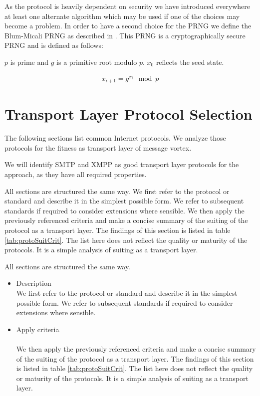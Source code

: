 As the protocol is heavily dependent on security we have introduced everywhere at least one alternate algorithm which may be used if one of the choices may become a problem. In order to have a second choice for the PRNG we define the Blum-Micali PRNG as described in \cite{blum1984generate}. This PRNG is a cryptographically secure PRNG and is defined as follows:

$p$ is prime and $g$ is a primitive root modulo $p$. $x_0$ reflects the seed state.

\begin{eqnarray}
x_{i+1}=g^{x_i}\mod p
\end{eqnarray}


\section{Transport Layer Protocol Selection\label{sec:transportProtocols}}
The following sections list common Internet protocols. We analyze those protocols for the fitness as transport layer of message vortex. 

We will identify SMTP and XMPP as good transport layer protocols for the \MessageVortex approach, as they have all required properties.

All sections are structured the same way. We first refer to the protocol or standard and describe it in the simplest possible form. We refer to subsequent standards if required to consider extensions where sensible. We then apply the previously referenced criteria and make a concise summary of the suiting of the protocol as a transport layer. The findings of this section is listed in table \ref{tab:protoSuitCrit}. The list here does not reflect the quality or maturity of the protocols. It is a simple analysis of suiting as a transport layer.

All sections are structured the same way. 
\begin{itemize}
	\item Description\\
	We first refer to the protocol or standard and describe it in the simplest possible form. We refer to subsequent standards if required to consider extensions where sensible.
	\item Apply criteria\\\\
	We then apply the previously referenced criteria and make a concise summary of the suiting of the protocol as a transport layer. The findings of this section is listed in table \ref{tab:protoSuitCrit}. The list here does not reflect the quality or maturity of the protocols. It is a simple analysis of suiting as a transport layer.
\end{itemize} 

